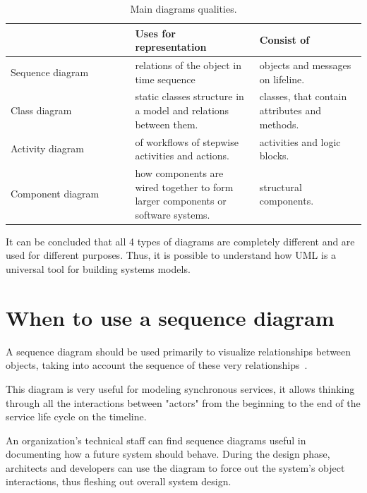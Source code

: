 \documentclass[10pt, twoside, slovak,a4paper]{article}
\begin{document}
 \begin{table}[htbp]
	\begin{tabular}{|p{0.35\linewidth}|p{0.35\linewidth}|p{0.35\linewidth}|}
	\hline
					  & Uses for representation                                                          & Consist of                                    \\ 
					  \hline
	Sequence diagram  & relations of the object in time sequence                                         & objects and messages on lifeline.             \\ 
	\hline
	Class diagram     & static classes structure in a model and relations between them.                  & classes, that contain attributes and methods. \\ 
	\hline
	Activity diagram  & of workflows of stepwise activities and actions.                                 & activities and logic blocks.                  \\ 
	\hline
	Component diagram & how components are wired together to form larger components or software systems. & structural components.                        \\ 
	\hline
	\end{tabular}
	\caption{Main diagrams qualities\cite{UML_Distilled}.}
	\label{Table}
\end{table}

It can be concluded that all 4 types of diagrams are completely different and are used for different purposes. Thus, it is possible to understand how UML is a universal tool for building systems models.

\section{When to use a sequence diagram} \label{when}

A sequence diagram should be used primarily to visualize relationships between objects, taking into account the sequence of these very relationships~\cite{IBM_SD}.

This diagram is very useful for modeling synchronous services, it allows thinking through all the interactions between "actors" from the beginning to the end of the service life cycle on the timeline.

An organization’s technical staff can find sequence diagrams useful in documenting how a future system should behave. During the design phase, architects and developers can use the diagram to force out the system’s object interactions, thus fleshing out overall system design.
\end{document}
